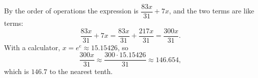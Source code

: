 By the order of operations the expression is $\dfrac{83x}{31}+7x$, and the two terms are like terms:
\[\dfrac{83x}{31}+7x=\dfrac{83x}{31}+\dfrac{217x}{31}=\dfrac{300x}{31}.\]
With a calculator, $x=e^{e}\approx15.15426$, so
\[\dfrac{300x}{31}\approx\dfrac{300\cdot15.15426}{31}\approx146.654,\]
which is $\boxed{146.7}$ to the nearest tenth.
